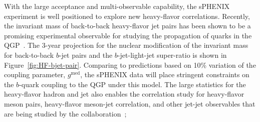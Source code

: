 With the large acceptance and multi-observable capability, the sPHENIX
experiment is well positioned to explore new heavy-flavor
correlations. Recently, the invariant mass of back-to-back
heavy-flavor jet pairs has been shown to be a promising experimental
observable for studying the propagation of quarks in the
QGP~\cite{Kang:2018wrs}. The 3-year projection for the nuclear
modification of the invariant mass for back-to-back $b$-jet pairs and the
$b$-jet-light-jet super-ratio is shown in
Figure~\ref{fig:HF-bjet-pair}. Comparing to predictions based on 10\%
variation of the coupling parameter, $g^{\textrm{med}}$, the sPHENIX
data will place stringent constraints on the $b$-quark coupling to the
QGP under this model. 
The large statistics for the heavy-flavor hadron and jet also enables the correlation study for heavy-flavor meson pairs, 
heavy-flavor meson-jet correlation, and other jet-jet observables that are being studied by the collaboration~\cite{sPH-HF-2017-002,sPH-HF-2017-001};



